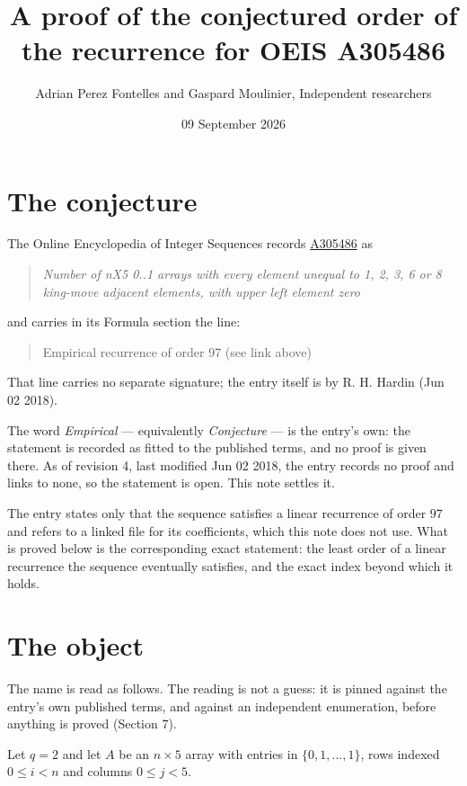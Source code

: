 \documentclass[11pt]{article}
\title{A proof of the conjectured order of the recurrence for OEIS A305486}
\author{Adrian Perez Fontelles and Gaspard Moulinier, Independent researchers}
\date{09 September 2026}
\theoremstyle{definition}
\begin{document}
\maketitle
\section{The conjecture}

The Online Encyclopedia of Integer Sequences records \href{https://oeis.org/A305486}{A305486} as

\begin{quote}\itshape Number of nX5 0..1 arrays with every element unequal to 1, 2, 3, 6 or 8 king-move adjacent elements, with upper left element zero\end{quote}

and carries in its Formula section the line:

\begin{quote}\ttfamily Empirical recurrence of order 97 (see link above)\end{quote}

That line carries no separate signature; the entry itself is by R. H. Hardin (Jun 02 2018).

The word {\itshape Empirical} --- equivalently {\itshape Conjecture} --- is the entry's own: the statement is recorded as fitted to the published terms, and no proof is given there. As of revision 4, last modified Jun 02 2018, the entry records no proof and links to none, so the statement is open. This note settles it.

The entry states only that the sequence satisfies a linear recurrence of order $97$ and refers to a linked file for its coefficients, which this note does not use. What is proved below is the corresponding exact statement: the least order of a linear recurrence the sequence eventually satisfies, and the exact index beyond which it holds.

\section{The object}

The name is read as follows. The reading is not a guess: it is pinned against the entry's own published terms, and against an independent enumeration, before anything is proved (Section 7).

Let $q = 2$ and let $A$ be an $n \times 5$ array with entries in $\{0,1,\dots,1\}$, rows indexed $0 \le i < n$ and columns $0 \le j < 5$.
\end{document}
